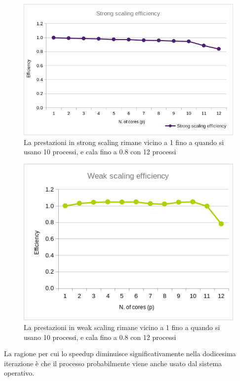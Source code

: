 \documentclass[a4paper,11pt, twoside]{report}
\begin{document}
\begin{figure}[H]
    \includegraphics[scale=0.5]{images/mpi_strong.png}
    \caption[short]{La prestazioni in strong scaling rimane vicino a 1 fino a quando si usano 10 processi, e cala fino a 0.8 con 12 processi}
\end{figure}
\begin{figure}[H]
    \includegraphics[scale=0.5]{images/mpi_weak.png}
    \caption[short]{La prestazioni in weak scaling rimane vicino a 1 fino a quando si usano 10 processi, e cala fino a 0.8 con 12 processi}
\end{figure}
La ragione per cui lo speedup diminuisce significativamente nella dodicesima iterazione è che il processo probabilmente viene anche usato dal sistema operativo.
\end{document}
